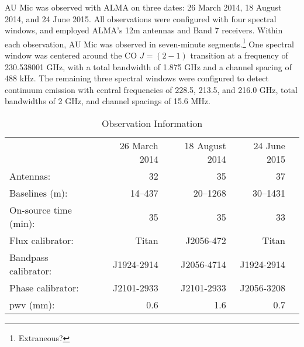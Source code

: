 \documentclass[12pt,oneside]{book}
\begin{document}
\frontmatter %


% 
% 






\mainmatter %
% 

AU Mic was observed  with ALMA on three dates: 26 March 2014, 18 August 2014, and 24 June 2015. 
All observations were configured with four spectral windows, and employed ALMA's 12m antennas and Band 7 receivers. 
Within each observation, AU Mic was observed in seven-minute segments.\footnote{Extraneous?}
One spectral window was centered around the CO $J = (2-1)$ transition at a frequency of 230.538001 GHz, with a total bandwidth of 1.875 GHz and a channel spacing of 488 kHz.
The remaining three spectral windows were configured to detect continuum emission with central frequencies of 228.5, 213.5, and 216.0 GHz, total bandwidths of 2 GHz, and channel spacings of 15.6 MHz. 

\begin{table}	
  \centering
	\caption{Observation Information}
  \label{tab:observations}
  \begin{tabular}{lrrrr}
    \toprule
    & 26 March 2014 & 18 August 2014 & 24 June 2015 \\
    \cmidrule(lr){2-4}
    Antennas: & 32 & 35 & 37 \\
    Baselines (m): & 14--437 & 20--1268 & 30--1431 \\
    On-source time (min): & 35 & 35 & 33 \\
    Flux calibrator: & Titan & J2056-472 & Titan \\
    Bandpass calibrator: & J1924-2914 & J2056-4714 & J1924-2914 \\
    Phase calibrator: & J2101-2933 & J2101-2933 & J2056-3208  \\
    pwv (mm): & 0.6 & 1.6 & 0.7 \\
    \bottomrule
  \end{tabular}
\end{table}
\end{document}
